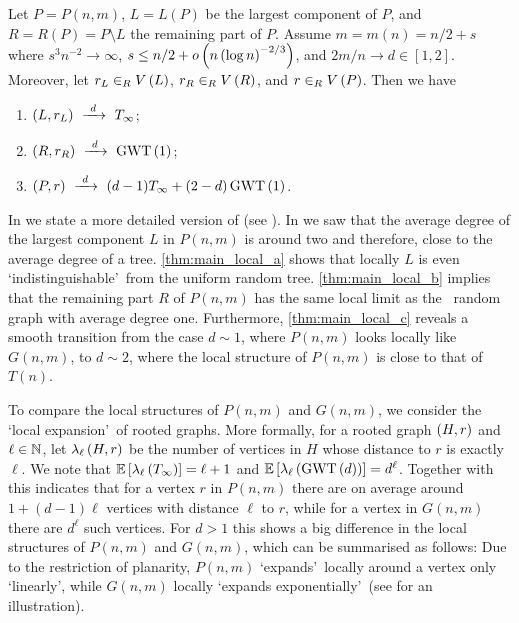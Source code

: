 \begin{thm}\label{thm:main_local}
Let $P=P(n,m)$, $L=L(P)$ be the largest component of $P$, and $R=R(P)=P\setminus L$ the remaining part of $P$. Assume $m=m(n)=n/2+s$ where $s^3n^{-2}\to \infty$, $s\leq n/2+o\left(n\left(\log n\right)^{-2/3}\right)$, and $2m/n\to d\in[1,2]$. Moreover, let $r_L\in_R V\left(L\right)$, $r_R\in_R V\left(R\right)$, and $r\in_R V\left(P\right)$. Then we have
\begin{enumerate}
    \item\label{thm:main_local_a}
    $\left(L, r_L\right)~\xrightarrow{~d~}~T_\infty$;
    \item\label{thm:main_local_b}
    $\left(R, r_R\right)~\xrightarrow{~d~}~\operatorname{GWT}\left(1\right)$;
    \item\label{thm:main_local_c}
    $\left(P, r\right)~\xrightarrow{~d~}~(d-1)T_\infty+(2-d)\operatorname{GWT}\left(1\right)$.
\end{enumerate}
\end{thm}

In  we state a more detailed version of  (see ). In  we saw that the average degree of the largest component $L$ in $P(n,m)$ is around two and therefore, close to the average degree of a tree. \ref{thm:main_local_a} shows that locally $L$ is even \lq indistinguishable\rq\ from the uniform random tree. \ref{thm:main_local_b} implies that the remaining part $R$ of $P(n,m)$ has the same local limit as the \ER\ random graph with average degree one. Furthermore, \ref{thm:main_local_c} reveals a smooth transition from the case $d\sim 1$, where $P(n,m)$ looks locally like $G(n,m)$, to $d\sim 2$, where the local structure of $P(n,m)$ is close to that of $T(n)$.

To compare the local structures of $P(n,m)$ and $G(n,m)$, we consider the \lq local expansion\rq\ of rooted graphs. More formally, for a rooted graph $\left(H, r\right)$ and $\ell\in\mathbb{N}$, let $\lambda_{\ell}\left(H, r\right)$ be the number of vertices in $H$ whose distance to $r$ is exactly $\ell$. We note that $\mathbb{E}\left[\lambda_{\ell}\left(T_\infty\right)\right]=\ell+1$ and $\mathbb{E}\left[\lambda_{\ell}\left(\operatorname{GWT}\left(d\right)\right)\right]=d^\ell$. Together with  this indicates that for a vertex $r$ in $P(n,m)$ there are on average around $1+(d-1)\ell$ vertices with distance $\ell$ to $r$, while for a vertex in $G(n,m)$ there are $d^\ell$ such vertices. For $d>1$ this shows a big difference in the local structures of $P(n,m)$ and $G(n,m)$, which can be summarised as follows: Due to the restriction of planarity, $P(n,m)$ \lq expands\rq\ locally around a vertex only \lq linearly\rq, while $G(n,m)$ locally \lq expands exponentially\rq\ (see  for an illustration).

